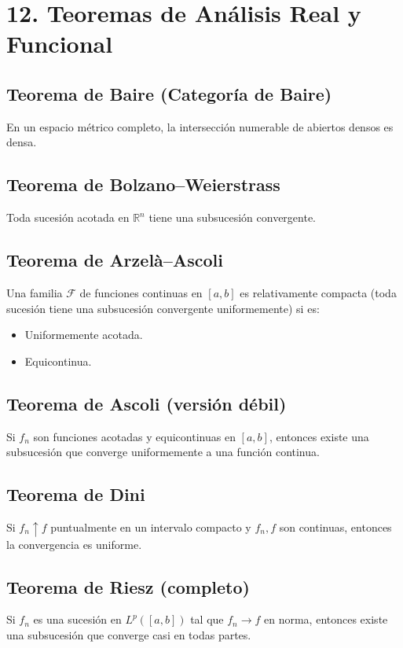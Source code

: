 \documentclass[12pt]{article}
\begin{document}
\newpage

\section{12. Teoremas de Análisis Real y Funcional}

\subsection{Teorema de Baire (Categoría de Baire)}
En un espacio métrico completo, la intersección numerable de abiertos densos es densa.

\subsection{Teorema de Bolzano–Weierstrass}
Toda sucesión acotada en \(\mathbb{R}^n\) tiene una subsucesión convergente.

\subsection{Teorema de Arzelà–Ascoli}
Una familia \(\mathcal{F}\) de funciones continuas en \([a,b]\) es relativamente compacta (toda sucesión tiene una subsucesión convergente uniformemente) si es:
\begin{itemize}
  \item Uniformemente acotada.
  \item Equicontinua.
\end{itemize}

\subsection{Teorema de Ascoli (versión débil)}
Si \(f_n\) son funciones acotadas y equicontinuas en \([a,b]\), entonces existe una subsucesión que converge uniformemente a una función continua.

\subsection{Teorema de Dini}
Si \(f_n \uparrow f\) puntualmente en un intervalo compacto y \(f_n, f\) son continuas, entonces la convergencia es uniforme.

\subsection{Teorema de Riesz (completo)}
Si \(f_n\) es una sucesión en \(L^p([a,b])\) tal que \(f_n \to f\) en norma, entonces existe una subsucesión que converge casi en todas partes.
\end{document}
